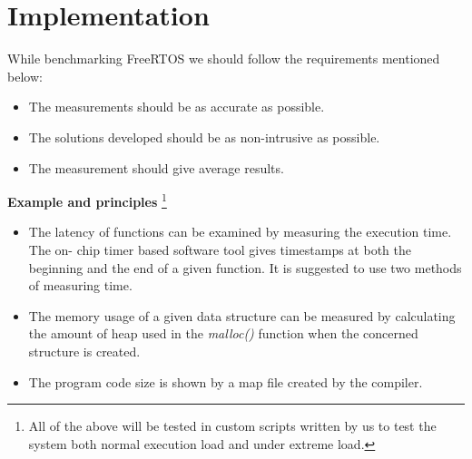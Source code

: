 \documentclass{article}
\begin{document}
\clearpage

\section{Implementation}

While benchmarking FreeRTOS we should follow the requirements mentioned below:
\begin{itemize}
    \item The measurements should be as accurate as possible.
    \item The solutions developed should be as non-intrusive as possible.
    \item The measurement should give average results.
\end{itemize}

\noindent \textbf{Example and principles} \footnote[1]{All of the above will be tested in custom scripts written by us to test the system both normal execution load and under extreme load.}

\begin{itemize}

\item The latency of functions can be examined by measuring the execution time. The on-
chip timer based software tool gives timestamps at both the beginning and the end of
a given function. It is suggested to use two methods of measuring time.

\item The memory usage of a given data structure can be measured by calculating the amount of heap used in the \textit{malloc()} function when the concerned structure is created.

\item The program code size is shown by a map file created by the compiler.

\end{itemize}


% 
% 
\end{document}
